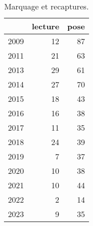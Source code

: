\begin{table}[htbp]
\centering
\caption[Marquage et recaptures. Les marques sont soit posées, soit lues lorsque l'anguille est déjà marquée.]{Marquage et recaptures.} 
\label{tablemr}
\begin{tabular}{lrr}
  \hline
 & lecture & pose \\ 
  \hline
2009 & 12 & 87 \\ 
  2011 & 21 & 63 \\ 
  2013 & 29 & 61 \\ 
  2014 & 27 & 70 \\ 
  2015 & 18 & 43 \\ 
  2016 & 16 & 38 \\ 
  2017 & 11 & 35 \\ 
  2018 & 24 & 39 \\ 
  2019 & 7 & 37 \\ 
  2020 & 10 & 38 \\ 
  2021 & 10 & 44 \\ 
  2022 & 2 & 14 \\ 
  2023 & 9 & 35 \\ 
   \hline
\end{tabular}
\end{table}
